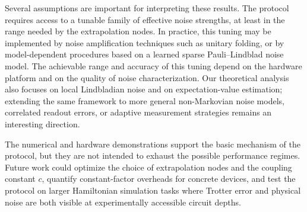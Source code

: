 \documentclass[aps,pra,reprint,groupedaddress,floatfix]{revtex4-2}
\begin{document}
Several assumptions are important for interpreting these results. The protocol requires access to a tunable family of effective noise strengths, at least in the range needed by the extrapolation nodes. In practice, this tuning may be implemented by noise amplification techniques such as unitary folding, or by model-dependent procedures based on a learned sparse Pauli--Lindblad noise model. The achievable range and accuracy of this tuning depend on the hardware platform and on the quality of noise characterization. Our theoretical analysis also focuses on local Lindbladian noise and on expectation-value estimation; extending the same framework to more general non-Markovian noise models, correlated readout errors, or adaptive measurement strategies remains an interesting direction.

The numerical and hardware demonstrations support the basic mechanism of the protocol, but they are not intended to exhaust the possible performance regimes. Future work could optimize the choice of extrapolation nodes and the coupling constant $c$, quantify constant-factor overheads for concrete devices, and test the protocol on larger Hamiltonian simulation tasks where Trotter error and physical noise are both visible at experimentally accessible circuit depths.



\appendix
\end{document}

